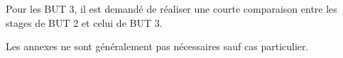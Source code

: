 \documentclass[12pt,oneside,noprintercorrection]{iut}
\begin{document}
\begin{aide}{}{}
Pour les BUT 3, il est demandé de réaliser une courte comparaison entre les stages de BUT 2 et celui de BUT 3.
\end{aide}


\small



\begin{aide}{}{}
  Les annexes ne sont généralement pas nécessaires sauf cas particulier.
\end{aide}
\end{document}
